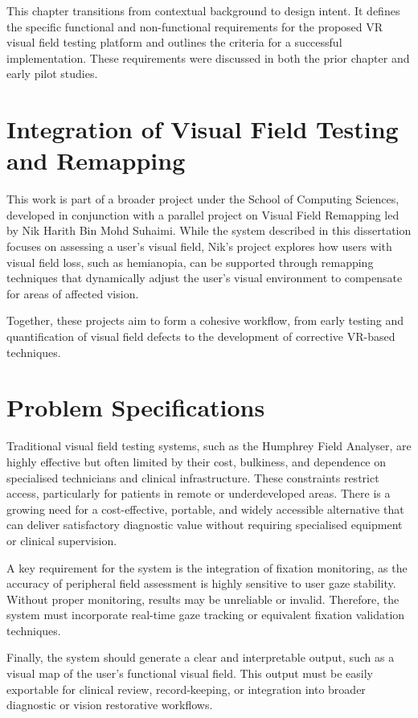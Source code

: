 \documentclass{l4proj}
\begin{document}
This chapter transitions from contextual background to design intent. It defines the specific functional and non-functional requirements for the proposed VR visual field testing platform and outlines the criteria for a successful implementation. These requirements were discussed in both the prior chapter and early pilot studies.

\section{Integration of Visual Field Testing and Remapping}
\label{integration}
This work is part of a broader project under the School of Computing Sciences, developed in conjunction with a parallel project on Visual Field Remapping led by Nik Harith Bin Mohd Suhaimi. While the system described in this dissertation focuses on assessing a user’s visual field, Nik’s project explores how users with visual field loss, such as hemianopia, can be supported through remapping techniques that dynamically adjust the user’s visual environment to compensate for areas of affected vision.

Together, these projects aim to form a cohesive workflow, from early testing and quantification of visual field defects to the development of corrective VR-based techniques.


\section{Problem Specifications}
Traditional visual field testing systems, such as the Humphrey Field Analyser, are highly effective but often limited by their cost, bulkiness, and dependence on specialised technicians and clinical infrastructure. These constraints restrict access, particularly for patients in remote or underdeveloped areas. There is a growing need for a cost-effective, portable, and widely accessible alternative that can deliver satisfactory diagnostic value without requiring specialised equipment or clinical supervision.

A key requirement for the system is the integration of fixation monitoring, as the accuracy of peripheral field assessment is highly sensitive to user gaze stability. Without proper monitoring, results may be unreliable or invalid. Therefore, the system must incorporate real-time gaze tracking or equivalent fixation validation techniques.

Finally, the system should generate a clear and interpretable output, such as a visual map of the user’s functional visual field. This output must be easily exportable for clinical review, record-keeping, or integration into broader diagnostic or vision restorative workflows.
\end{document}
